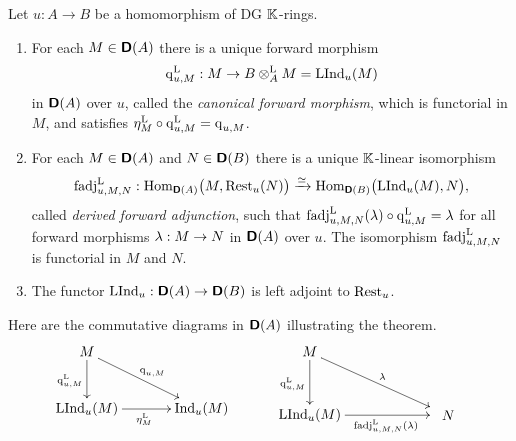 \begin{thm} \label{thm:3085} 
Let $u : A \to B$ be a homomorphism of DG $\mathbb{K}$-rings.
\begin{enumerate}
\item For each $M \in \boldsymbol{\mathsf{D}}(A)$ there is a unique forward morphism%
\[ \operatorname{q}_{u, M}^{\mathrm{L}} : M \to B \otimes^{\mathrm{L}}_{A} M = 
\operatorname{LInd}_u(M) \]
in $\boldsymbol{\mathsf{D}}(A)$ over $u$, called the {\em canonical forward morphism},
which is functorial in $M$, and satisfies 
$\eta^{\mathrm{L}}_M \circ \operatorname{q}_{u, M}^{\mathrm{L}} = \operatorname{q}_{u, M}$.

\item For each $M \in \boldsymbol{\mathsf{D}}(A)$ and $N \in \boldsymbol{\mathsf{D}}(B)$
there is a unique $\mathbb{K}$-linear isomorphism%
%
\[ \operatorname{fadj}_{u, M, N}^{\mathrm{L}} :  
\operatorname{Hom}_{\boldsymbol{\mathsf{D}}(A)} \bigl( M, \operatorname{Rest}_u(N) \bigr) \xrightarrow{\simeq} 
\operatorname{Hom}_{\boldsymbol{\mathsf{D}}(B)} \bigl( \operatorname{LInd}_u(M), N \bigr) , \]
called {\em derived forward adjunction}, such that 
$\operatorname{fadj}_{u, M, N}^{\mathrm{L}}(\lambda) \circ \operatorname{q}_{u, M}^{\mathrm{L}} = \lambda$
for all forward morphisms $\lambda : M \to N$ in $\boldsymbol{\mathsf{D}}(A)$ over $u$.
The isomorphism $\operatorname{fadj}_{u, M, N}^{\mathrm{L}}$ is functorial in $M$ and $N$. 

\item The functor
$\operatorname{LInd}_u : \boldsymbol{\mathsf{D}}(A) \to \boldsymbol{\mathsf{D}}(B)$
is left adjoint to $\operatorname{Rest}_u$. 
\end{enumerate}
\end{thm}

Here are the commutative diagrams in $\boldsymbol{\mathsf{D}}(A)$ illustrating the theorem. 
\[ \UseTips \xymatrix @C=8ex @R=6ex {
M
\ar[d]_{\opn{q}_{u, M}^{\mrm{L}}}
\ar[dr]^{\opn{q}_{u, M}} 
\\
\opn{LInd}_u(M)
\ar[r]_{\eta^{\mrm{L}}_M}
&
*+{\opn{Ind}_u(M)}
} 
\qquad \quad 
\UseTips \xymatrix @C=14ex @R=6ex {
M
\ar[d]_{\opn{q}_{u, M}^{\mrm{L}}}
\ar[dr]^{\la} 
\\
\opn{LInd}_u(M)
\ar[r]_(0.55){\opn{fadj}_{u, M, N}^{\mrm{L}}(\la)}
&
*+++{N}
} 
\]

